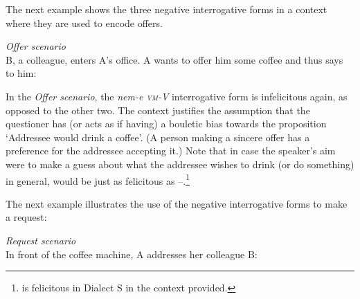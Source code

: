 \documentclass[output=paper,colorlinks,citecolor=brown]{langscibook}
\begin{document}
	The next example shows the  three negative interrogative forms in a context where they are used to encode offers. 
	
	\ea\label{ex:offer} \textit{Offer scenario}\\
	B, a colleague, enters A's office. A wants to offer him some coffee and thus says to him:
	\label{ex:meginnal-neme}
	\label{ex:meginnal-e}
	\label{ex:meginnal-rise-fall}
	\z
	\z
	
	\noindent In the \textit{Offer scenario}, the \textit{nem-e \textsc{vm}-V} interrogative form is  infelicitous again, as opposed to the other two. The context justifies the assumption that the questioner has (or acts as if having) a bouletic bias towards the proposition `Addressee would drink a coffee'. (A person making a sincere offer has a preference for the addressee accepting it.)  Note that in case the speaker's aim were to make a guess about what the addressee wishes to drink (or do something) in general,  would be just as felicitous as --.\footnote{ is felicitous in Dialect S in the context provided.}

	
	
	The next example illustrates the use of the negative interrogative forms to make a request:
	
	\ea\label{ex:request}   \textit{Request scenario}\\
	In front of the coffee machine, A addresses her colleague B:
	\label{ex:adnal-neme}
	\z
	\z
	
\end{document}
